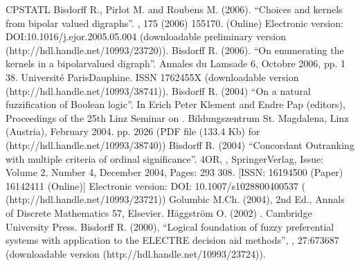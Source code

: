 \documentclass[a4paper,12pt,english]{sphinxhowto}
\begin{document}
\begin{sphinxthebibliography}{CPSTAT\sphinxhyphen{}L}
Bisdorff R., Pirlot M. and Roubens M. (2006). “Choices and kernels from bipolar valued digraphs”. , 175 (2006) 155\sphinxhyphen{}170. (Online) Electronic version: DOI:10.1016/j.ejor.2005.05.004 (downloadable preliminary version  (http://hdl.handle.net/10993/23720)).
Bisdorff R. (2006). “On enumerating the kernels in a bipolar\sphinxhyphen{}valued digraph”. Annales du Lamsade 6, Octobre 2006, pp. 1 \sphinxhyphen{} 38. Université Paris\sphinxhyphen{}Dauphine. ISSN 1762\sphinxhyphen{}455X (downloadable version  (http://hdl.handle.net/10993/38741)).
Bisdorff R. (2004) “On a natural fuzzification of Boolean logic”. In Erich Peter Klement and Endre Pap (editors), Proceedings of the 25th Linz Seminar on . Bildungszentrum St. Magdalena, Linz (Austria), February 2004. pp. 20\sphinxhyphen{}26 (PDF file (133.4 Kb) for  (http://hdl.handle.net/10993/38740))
Bisdorff R. (2004) “Concordant Outranking with multiple criteria of ordinal significance”. 4OR, , Springer\sphinxhyphen{}Verlag, Issue: Volume 2, Number 4, December 2004, Pages: 293 \sphinxhyphen{} 308. {[}ISSN: 1619\sphinxhyphen{}4500 (Paper) 1614\sphinxhyphen{}2411 (Online){]} Electronic version: DOI: 10.1007/s10288\sphinxhyphen{}004\sphinxhyphen{}0053\sphinxhyphen{}7 ( (http://hdl.handle.net/10993/23721))
Golumbic M.Ch. (2004),  2nd Ed., Annals of Discrete Mathematics 57, Elsevier.
Häggström O. (2002) . Cambridge University Press.
Bisdorff R. (2000), “Logical foundation of fuzzy preferential systems with application to the ELECTRE decision aid methods”, , 27:673\sphinxhyphen{}687 (downloadable version  (http://hdl.handle.net/10993/23724)).

\end{sphinxthebibliography}
\end{document}

